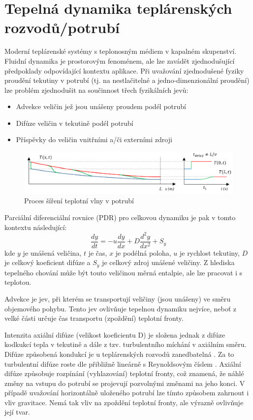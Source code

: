 \section{Tepelná dynamika teplárenských rozvodů/potrubí}
\label{sec:HeatDynamics}
Moderní teplárenské systémy s teplonosným médiem v kapalném skupenství. Fluidní
dynamika je prostorovým fenoménem, ale lze zavádět zjednodušující předpoklady
odpovídající kontextu aplikace. Při uvažování zjednodušené fyziky proudění
tekutiny v potrubí (tj. na nestlačitelné a jedno-dimenzionální proudění) lze
problém zjednodušit na součinnost třech fyzikálních jevů:

\begin{itemize}
\item Advekce veličin jež jsou unášeny proudem podél potrubí
\item Difůze veličin v tekutině podél potrubí
\item Příspěvky do veličin vnitřními a/či externími zdroji
\end{itemize}

\begin{figure}[h] \capstart
  \label{fig:heatwave}
  \includegraphics[width=\textwidth]{figures/heat_front}
  \caption{Proces šíření teplotní vlny v potrubí} 
\end{figure}

Parciální diferenciální rovnice (PDR) pro celkovou dynamiku je pak v tomto
kontextu následující:
\begin{equation}
  \label{eq:AdvDiff}
  \frac{dy}{dt} = -u \frac{dy}{dx} + D\frac{d^{2}y}{dx^2} + {S_y}
\end{equation}
kde \(y\) je unášená veličina, \(t\) je čas, \(x\) je podélná poloha, \(u\) je
rychlost tekutiny, \(D\) je celkový koeficient difúze a \(S_y\) je celkový
zdroj unášené veličiny. Z hlediska tepelného chování může být touto veličinou
měrná entalpie, ale lze pracovat i s teplotou.

Advekce je jev, při kterém se transportují veličiny (jsou unášeny) ve směru
objemového pohybu. Tento jev ovlivňuje tepelnou dynamiku nejvíce, neboť z velké
části určuje čas transportu (zpoždění) teplotní fronty.

Intenzita axiální difúze (velikost koeficientu D) je složena jednak z difúze
kodkukcí tepla v tekutině a dále z tzv. turbulentního míchání v axiálním směru.
Difúze způsobená kondukcí je u teplárenských rozvodů zanedbatelná
\cite{VanderHeijde2017a,VanderHeijde2017b}. Za to turbulentní difúze roste dle
přibližně lineárně s Reynoldsovým číslem \cite{Chertkov2018}. Axiální difúze
způsobuje rozpínání (vyhlazování) teplotní fronty, což znamená, že náhlé změny
na vstupu do potrubí se projevují pozvolnými změnami na jeho konci. V případě
uvažování horizontálně uloženého potrubí lze tímto způsobem zahrnout i vliv
gravitace. Nemá tak vliv na zpoždění teplotní fronty, ale výrazně ovlivňuje
její tvar.

